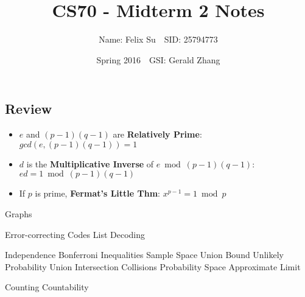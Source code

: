 \documentclass{article}\usepackage{amsmath,amssymb,amsthm,tikz,tkz-graph,color,chngpage,soul,hyperref,csquotes,graphicx,floatrow, listings,polynom}\newcommand*{\QEDB}{\hfill\ensuremath{\square}}\newtheorem*{prop}{Proposition}\renewcommand{\theenumi}{\alph{enumi}}\usepackage[shortlabels]{enumitem}\usepackage[nobreak=true]{mdframed}\usetikzlibrary{matrix,calc}\MakeOuterQuote{"}\usepackage[margin=0.75in]{geometry} \newtheorem{theorem}{Theorem}\newcommand{\Z}{\mathbb Z}\newcommand{\R}{\mathbb R}\newcommand{\Q}{\mathbb Q}\newcommand{\N}{\mathbb N}\newcommand{\x}[1]{\textrm{ #1 }}\newcommand{\pr}{\textrm{Pr}}
\title{CS70 - Midterm 2 Notes}
\author{Name: Felix Su$\quad$SID: 25794773}
\date{Spring 2016$\quad$GSI: Gerald Zhang}
\begin{document}
\maketitle

\subsection*{Review}
\begin{itemize}
    \item $e$ and $(p − 1)(q − 1)$ are \textbf{Relatively Prime}: $gcd(e,(p − 1)(q − 1)) = 1$
    \item $d$ is the \textbf{Multiplicative Inverse} of $e \bmod (p-1)(q-1)$: $ed = 1 \bmod (p-1)(q-1)$
    \item If $p$ is prime, \textbf{Fermat's Little Thm}: $x^{p-1} = 1 \bmod p$
\end{itemize}

Graphs

Error-correcting Codes
List Decoding

Independence
Bonferroni Inequalities
Sample Space
Union Bound
Unlikely Probability
Union
Intersection
Collisions
Probability Space
Approximate Limit

Counting
Countability


 \pagebreak

\end{document}
